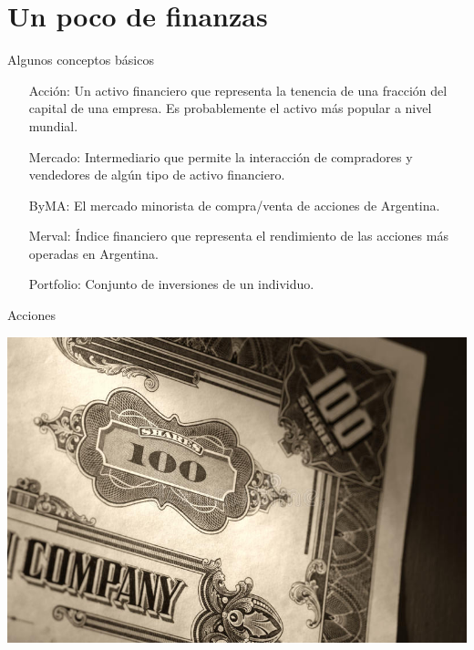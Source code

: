 \documentclass[12pt,aspectratio=169]{beamer}
\begin{document}
\section{Un poco de finanzas}

\begin{frame}{Algunos conceptos básicos}
\begin{itemize}
\item[Acción:] Un activo financiero que representa la tenencia de una fracción del capital de una empresa. Es probablemente el activo más popular a nivel mundial.

\item[Mercado:] Intermediario que permite la interacción de compradores y vendedores de algún tipo de activo financiero.

\item[ByMA:] El mercado minorista de compra/venta de acciones de Argentina.

\item[Merval:] Índice financiero que representa el rendimiento de las acciones más operadas en Argentina.

\item[Portfolio:] Conjunto de inversiones de un individuo.
\end{itemize}
\end{frame}

\begin{frame}{Acciones}
\begin{center}
	\includegraphics[width=.6\paperwidth]{stock.jpg}
\end{center}
\end{frame}
\end{document}
